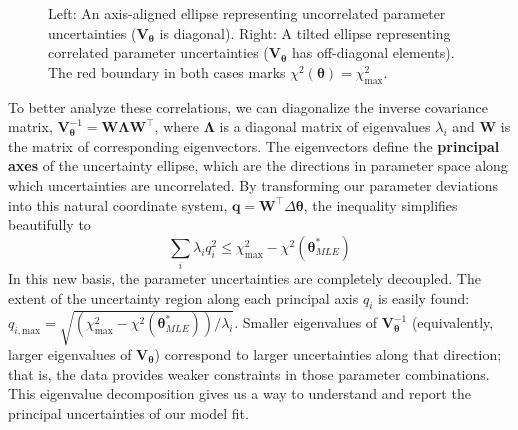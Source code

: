 \begin{figure}[h!]
    \caption{Left: An axis-aligned ellipse representing uncorrelated parameter uncertainties ($\mathbf{V}_{\boldsymbol{\theta}}$ is diagonal). Right: A tilted ellipse representing correlated parameter uncertainties ($\mathbf{V}_{\boldsymbol{\theta}}$ has off-diagonal elements). The red boundary in both cases marks $\chi^2(\boldsymbol{\theta}) = \chi^2_{\text{max}}$.}
    \label{fig:corr_uncorr}
\end{figure}

To better analyze these correlations, we can diagonalize the inverse covariance matrix, $\mathbf{V}_{\boldsymbol{\theta}}^{-1} = \mathbf{W}\mathbf{\Lambda}\mathbf{W}^\top$, where $\mathbf{\Lambda}$ is a diagonal matrix of eigenvalues $\lambda_i$ and $\mathbf{W}$ is the matrix of corresponding eigenvectors. The eigenvectors define the \textbf{principal axes} of the uncertainty ellipse, which are the directions in parameter space along which uncertainties are uncorrelated. By transforming our parameter deviations into this natural coordinate system, $\mathbf{q} = \mathbf{W}^\top \Delta\boldsymbol{\theta}$, the inequality simplifies beautifully to
\begin{equation}
    \sum_i \lambda_i q_i^2 \leq \chi^2_{\text{max}} - \chi^2(\boldsymbol{\theta}^*_{MLE})
\end{equation}
In this new basis, the parameter uncertainties are completely decoupled. The extent of the uncertainty region along each principal axis $q_i$ is easily found: $q_{i, \text{max}} = \sqrt{(\chi^2_{\text{max}} - \chi^2(\boldsymbol{\theta}^*_{MLE}))/\lambda_i}$. Smaller eigenvalues of $\mathbf{V}_{\boldsymbol{\theta}}^{-1}$ (equivalently, larger eigenvalues of $\mathbf{V}_{\boldsymbol{\theta}}$) correspond to larger uncertainties along that direction; that is, the data provides weaker constraints in those parameter combinations. This eigenvalue decomposition gives us a way to understand and report the principal uncertainties of our model fit.

